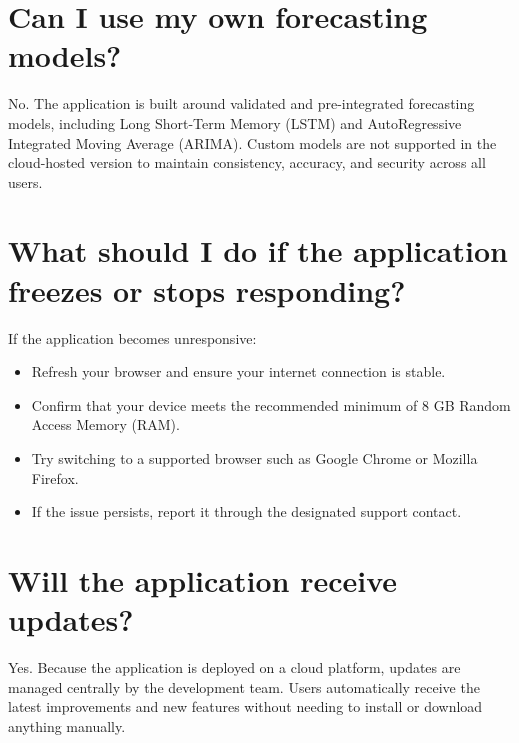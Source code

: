 \section{Can I use my own forecasting models?}
No. The application is built around validated and pre-integrated forecasting models, including Long Short-Term Memory (LSTM) and AutoRegressive Integrated Moving Average (ARIMA). Custom models are not supported in the cloud-hosted version to maintain consistency, accuracy, and security across all users.

\section{What should I do if the application freezes or stops responding?}
If the application becomes unresponsive:
\begin{itemize}
	\item Refresh your browser and ensure your internet connection is stable.
	\item Confirm that your device meets the recommended minimum of 8 GB Random Access Memory (RAM).
	\item Try switching to a supported browser such as Google Chrome or Mozilla Firefox.
	\item If the issue persists, report it through the designated support contact.
\end{itemize}

\section{Will the application receive updates?}
Yes. Because the application is deployed on a cloud platform, updates are managed centrally by the development team. Users automatically receive the latest improvements and new features without needing to install or download anything manually.

